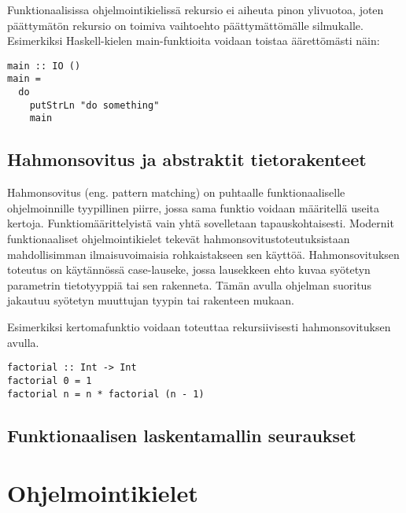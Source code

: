 Funktionaalisissa ohjelmointikielissä rekursio ei aiheuta pinon ylivuotoa, joten päättymätön rekursio on toimiva
vaihtoehto päättymättömälle silmukalle. Esimerkiksi Haskell-kielen main-funktioita voidaan toistaa äärettömästi näin:
\begin{verbatim}
main :: IO ()
main =
  do
    putStrLn "do something"
    main
\end{verbatim}


\subsection{Hahmonsovitus ja abstraktit tietorakenteet}

Hahmonsovitus (eng. pattern matching) on puhtaalle funktionaaliselle ohjelmoinnille tyypillinen piirre, jossa sama
funktio voidaan määritellä useita kertoja. Funktiomäärittelyistä vain yhtä sovelletaan tapauskohtaisesti. Modernit
funktionaaliset ohjelmointikielet tekevät hahmonsovitustoteutuksistaan mahdollisimman ilmaisuvoimaisia rohkaistakseen
sen käyttöä. Hahmonsovituksen toteutus on käytännössä case-lauseke, jossa lausekkeen ehto kuvaa syötetyn parametrin
tietotyyppiä tai sen rakenneta. Tämän avulla ohjelman suoritus jakautuu syötetyn muuttujan tyypin tai rakenteen mukaan.

Esimerkiksi kertomafunktio voidaan toteuttaa rekursiivisesti hahmonsovituksen avulla.
\begin{verbatim}
factorial :: Int -> Int
factorial 0 = 1
factorial n = n * factorial (n - 1)
\end{verbatim}

\subsection{Funktionaalisen laskentamallin seuraukset}

\section{Ohjelmointikielet}



